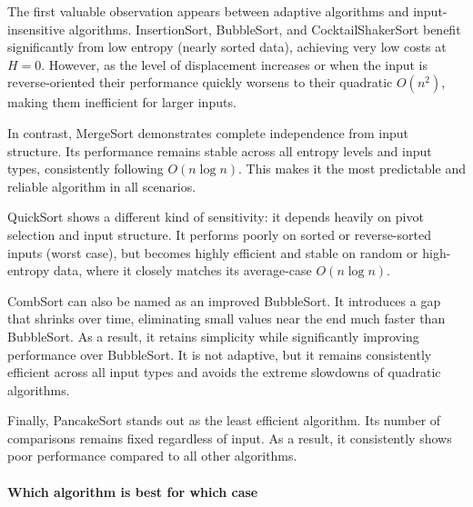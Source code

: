\documentclass{article}
\begin{document}
The first valuable observation appears between adaptive algorithms and input-insensitive algorithms. InsertionSort, BubbleSort, and CocktailShakerSort benefit significantly from low entropy (nearly sorted data), achieving very low costs at $H=0$. However, as the level of displacement increases or when the input is reverse-oriented their performance quickly worsens to their quadratic $O(n^2)$, making them inefficient for larger inputs.

In contrast, MergeSort demonstrates complete independence from input structure. Its performance remains stable across all entropy levels and input types, consistently following $O(n \log n)$. This makes it the most predictable and reliable algorithm in all scenarios.

QuickSort shows a different kind of sensitivity: it depends heavily on pivot selection and input structure. It performs poorly on sorted or reverse-sorted inputs (worst case), but becomes highly efficient and stable on random or high-entropy data, where it closely matches its average-case $O(n \log n)$.

CombSort can also be named as an improved BubbleSort. It introduces a gap that shrinks over time, eliminating small values near the end much faster than BubbleSort. As a result, it retains simplicity while significantly improving performance over BubbleSort. It is not adaptive, but it remains consistently efficient across all input types and avoids the extreme slowdowns of quadratic algorithms.

Finally, PancakeSort stands out as the least efficient algorithm. Its number of comparisons remains fixed regardless of input. As a result, it consistently shows poor performance compared to all other algorithms.

\paragraph{Which algorithm is best for which case}
\end{document}
